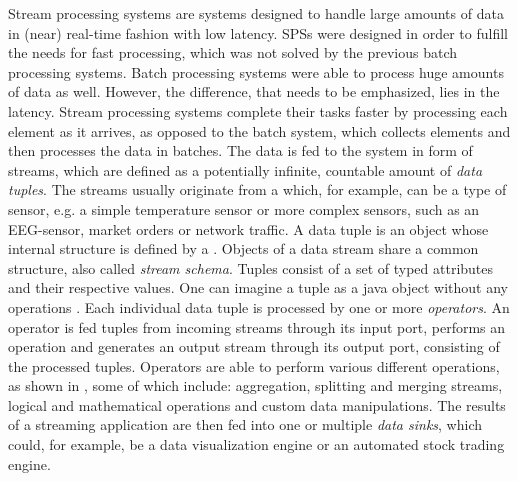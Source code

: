         \quad Stream processing systems are systems designed to handle large amounts of data in (near) real-time fashion with low latency.
        SPSs were designed in order to fulfill the needs for fast processing, which was not solved by the previous batch processing systems.
        Batch processing systems were able to process huge amounts of data as well. However, the difference, that needs to be emphasized, lies in the latency.
        Stream processing systems complete their tasks faster by processing each element as it arrives, as opposed to the batch system, which collects elements 
        and then processes the data in batches.
        The data is fed to the system in form of streams, which are defined as a potentially infinite, countable amount of \textit{data tuples}. 
        The streams usually originate from a  which, for example, can be a type of sensor, e.g. a simple temperature sensor or more complex sensors, 
        such as an EEG-sensor, market orders or network traffic.
        A data tuple is an object whose internal structure is defined by a . 
        Objects of a data stream share a common structure, also called \textit{stream schema}.
        Tuples consist of a set of typed attributes and their respective values. One can imagine a tuple as a java object without any operations \cite{fundamentals}.
        Each individual data tuple is processed by one or more \textit{operators}.
        An operator is fed tuples from incoming streams through its input port, performs an operation and generates an output stream through its output port, 
        consisting of the processed tuples. Operators are able to perform various different operations, 
        as shown in \cite[p. 49]{fundamentals}, some of which include: aggregation, splitting and merging streams, 
        logical and mathematical operations and custom data manipulations.
        The results of a streaming application are then fed into one or multiple \textit{data sinks}, which could, for example, be a data visualization engine 
        or an automated stock trading engine.
        
